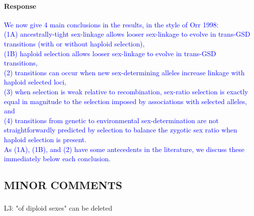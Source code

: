 \documentclass[10pt,letterpaper]{article}
\begin{document}
\noindent\paragraph{Response}
\textcolor{blue}{
We now give 4 main conclusions in the results, in the style of Orr 1998:\\
(1A) ancestrally-tight sex-linkage allows looser sex-linkage to evolve in trans-GSD transitions (with or without haploid selection),\\
(1B) haploid selection allows looser sex-linkage to evolve in trans-GSD transitions,\\
(2) transitions can occur when new sex-determining alleles increase linkage with haploid selected loci,\\
(3) when selection is weak relative to recombination, sex-ratio selection is exactly equal in magnitude to the selection imposed by associations with selected alleles, and\\
(4) transitions from genetic to environmental sex-determination are not straightforwardly predicted by selection to balance the zygotic sex ratio when haploid selection is present.
\vspace{0.25cm}\\
As (1A), (1B), and (2) have some antecedents in the literature, we discuss these immediately below each conclusion. 
}

\subsection{MINOR COMMENTS}

\noindent\subsubsection{}
L3: "of diploid sexes" can be deleted
\end{document}
